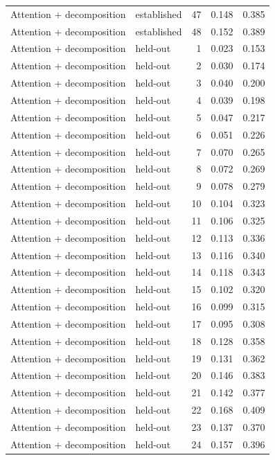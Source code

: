 \begin{tabular}{llrrr}
Attention + decomposition & established & 47 & 0.148 & 0.385 \\
Attention + decomposition & established & 48 & 0.152 & 0.389 \\
Attention + decomposition & held-out & 1 & 0.023 & 0.153 \\
Attention + decomposition & held-out & 2 & 0.030 & 0.174 \\
Attention + decomposition & held-out & 3 & 0.040 & 0.200 \\
Attention + decomposition & held-out & 4 & 0.039 & 0.198 \\
Attention + decomposition & held-out & 5 & 0.047 & 0.217 \\
Attention + decomposition & held-out & 6 & 0.051 & 0.226 \\
Attention + decomposition & held-out & 7 & 0.070 & 0.265 \\
Attention + decomposition & held-out & 8 & 0.072 & 0.269 \\
Attention + decomposition & held-out & 9 & 0.078 & 0.279 \\
Attention + decomposition & held-out & 10 & 0.104 & 0.323 \\
Attention + decomposition & held-out & 11 & 0.106 & 0.325 \\
Attention + decomposition & held-out & 12 & 0.113 & 0.336 \\
Attention + decomposition & held-out & 13 & 0.116 & 0.340 \\
Attention + decomposition & held-out & 14 & 0.118 & 0.343 \\
Attention + decomposition & held-out & 15 & 0.102 & 0.320 \\
Attention + decomposition & held-out & 16 & 0.099 & 0.315 \\
Attention + decomposition & held-out & 17 & 0.095 & 0.308 \\
Attention + decomposition & held-out & 18 & 0.128 & 0.358 \\
Attention + decomposition & held-out & 19 & 0.131 & 0.362 \\
Attention + decomposition & held-out & 20 & 0.146 & 0.383 \\
Attention + decomposition & held-out & 21 & 0.142 & 0.377 \\
Attention + decomposition & held-out & 22 & 0.168 & 0.409 \\
Attention + decomposition & held-out & 23 & 0.137 & 0.370 \\
Attention + decomposition & held-out & 24 & 0.157 & 0.396 \\

\end{tabular}
